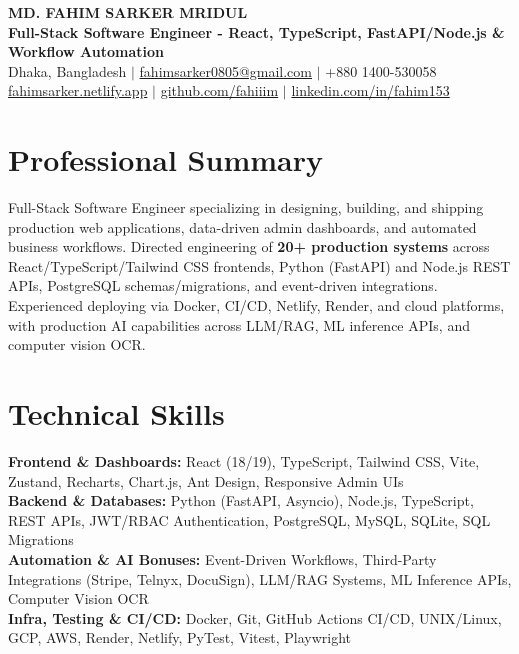 \documentclass[9.5pt,a4paper]{article}
\begin{document}
{\centering
    {\Large \textbf{MD. FAHIM SARKER MRIDUL}}\\[1pt]
    \textbf{Full-Stack Software Engineer - React, TypeScript, FastAPI/Node.js \& Workflow Automation}\\[1pt]
    Dhaka, Bangladesh \;$\vert$\; \href{mailto:fahimsarker0805@gmail.com}{fahimsarker0805@gmail.com} \;$\vert$\; +880 1400-530058\\[1pt]
    \href{https://fahimsarker.netlify.app}{fahimsarker.netlify.app} \;$\vert$\; \href{https://github.com/fahiiim}{github.com/fahiiim} \;$\vert$\; \href{https://linkedin.com/in/fahim153}{linkedin.com/in/fahim153}\par
}

\vspace{-4.5pt}
\section*{Professional Summary}
Full-Stack Software Engineer specializing in designing, building, and shipping production web applications, data-driven admin dashboards, and automated business workflows. Directed engineering of \textbf{20+ production systems} across React/TypeScript/Tailwind CSS frontends, Python (FastAPI) and Node.js REST APIs, PostgreSQL schemas/migrations, and event-driven integrations. Experienced deploying via Docker, CI/CD, Netlify, Render, and cloud platforms, with production AI capabilities across LLM/RAG, ML inference APIs, and computer vision OCR.

\section*{Technical Skills}
\noindent
\textbf{Frontend \& Dashboards:} React (18/19), TypeScript, Tailwind CSS, Vite, Zustand, Recharts, Chart.js, Ant Design, Responsive Admin UIs\\
\textbf{Backend \& Databases:} Python (FastAPI, Asyncio), Node.js, TypeScript, REST APIs, JWT/RBAC Authentication, PostgreSQL, MySQL, SQLite, SQL Migrations\\
\textbf{Automation \& AI Bonuses:} Event-Driven Workflows, Third-Party Integrations (Stripe, Telnyx, DocuSign), LLM/RAG Systems, ML Inference APIs, Computer Vision OCR\\
\textbf{Infra, Testing \& CI/CD:} Docker, Git, GitHub Actions CI/CD, UNIX/Linux, GCP, AWS, Render, Netlify, PyTest, Vitest, Playwright
\end{document}
